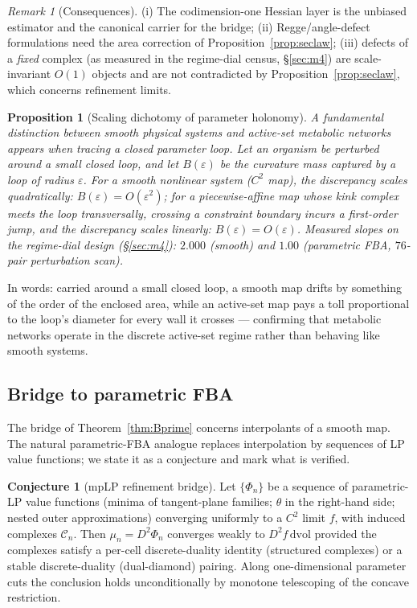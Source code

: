 \documentclass[11pt,a4paper]{article}
\theoremstyle{plain}
\newtheorem{proposition}[theorem]{Proposition}
\theoremstyle{definition}
\newtheorem{conjecture}[theorem]{Conjecture}
\theoremstyle{remark}
\newtheorem{remark}[theorem]{Remark}
\newcommand{\dvol}{\,\mathrm{dvol}}
\begin{document}
\begin{remark}[Consequences]
(i) The codimension-one Hessian layer is the unbiased estimator and the
canonical carrier for the bridge; (ii) Regge/angle-defect formulations
need the area correction of Proposition~\ref{prop:seclaw}; (iii) defects
of a \emph{fixed} complex (as measured in the regime-dial census, \S\ref{sec:m4}) are
scale-invariant $O(1)$ objects and are not contradicted by
Proposition~\ref{prop:seclaw}, which concerns refinement limits.
\end{remark}

\begin{proposition}[Scaling dichotomy of parameter holonomy]
\label{prop:dichotomy}
A fundamental distinction between smooth physical systems and
active-set metabolic networks appears when tracing a closed parameter
loop. Let an organism be perturbed around a small closed loop, and
let $B(\varepsilon)$ be the curvature mass captured by a loop of radius
$\varepsilon$. For a smooth nonlinear system ($C^2$ map), the discrepancy
scales quadratically: $B(\varepsilon) = O(\varepsilon^2)$; for a
piecewise-affine map whose kink complex meets the loop transversally,
crossing a constraint boundary incurs a first-order jump, and the
discrepancy scales linearly: $B(\varepsilon) = O(\varepsilon)$. Measured
slopes on the regime-dial design (\S\ref{sec:m4}): $2.000$ (smooth) and
$1.00$ (parametric FBA, $76$-pair perturbation scan).
\end{proposition}

In words: carried around a small closed loop, a smooth map drifts by
something of the order of the enclosed area, while an active-set map
pays a toll proportional to the loop's diameter for every wall it
crosses --- confirming that metabolic networks operate in the
discrete active-set regime rather than behaving like smooth
systems.

\subsection{Bridge to parametric FBA}

The bridge of Theorem~\ref{thm:Bprime} concerns interpolants of a
smooth map. The natural parametric-FBA analogue replaces interpolation
by sequences of LP value functions; we state it as a conjecture and
mark what is verified.

\begin{conjecture}[mpLP refinement bridge]\label{conj:bridge}
Let $\{\Phi_n\}$ be a sequence of parametric-LP value functions (minima of
tangent-plane families; $\theta$ in the right-hand side; nested outer
approximations) converging uniformly to a $C^2$ limit $f$, with induced
complexes $\mathcal{C}_n$. Then $\mu_n = D^2\Phi_n$ converges weakly to
$D^2 f \dvol$ provided the complexes satisfy a per-cell discrete-duality
identity (structured complexes) or a stable discrete-duality
(dual-diamond) pairing. Along one-dimensional parameter cuts the
conclusion holds unconditionally by monotone telescoping of the concave
restriction.
\end{conjecture}
\end{document}
